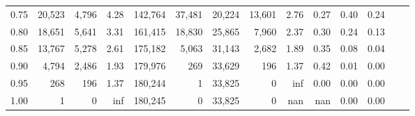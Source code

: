 \begin{tabular}{rrrrrrrrrrrrrr}
0.75 &  20,523 &  4,796 &    4.28 &  142,764 &   37,481 &  20,224 &  13,601 &  2.76 &  0.27 &  0.40 &      0.24 \\
0.80 &  18,651 &  5,641 &    3.31 &  161,415 &   18,830 &  25,865 &   7,960 &  2.37 &  0.30 &  0.24 &      0.13 \\
0.85 &  13,767 &  5,278 &    2.61 &  175,182 &    5,063 &  31,143 &   2,682 &  1.89 &  0.35 &  0.08 &      0.04 \\
0.90 &   4,794 &  2,486 &    1.93 &  179,976 &      269 &  33,629 &     196 &  1.37 &  0.42 &  0.01 &      0.00 \\
0.95 &     268 &    196 &    1.37 &  180,244 &        1 &  33,825 &       0 &   inf &  0.00 &  0.00 &      0.00 \\
1.00 &       1 &      0 &     inf &  180,245 &        0 &  33,825 &       0 &   nan &   nan &  0.00 &      0.00 \\
\bottomrule
\end{tabular}
